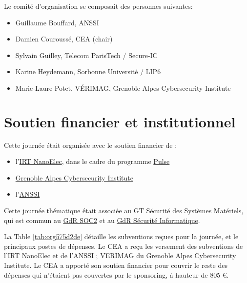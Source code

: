 \documentclass[a4paper,11pt]{article}
\begin{document}
Le comité d'organisation se composait des personnes suivantes:

\begin{itemize}
\item Guillaume Bouffard,  ANSSI
\item Damien Couroussé, CEA  (chair)
\item Sylvain Guilley, Telecom ParisTech / Secure-IC
\item Karine Heydemann, Sorbonne Université / LIP6
\item Marie-Laure Potet, VÉRIMAG,  Grenoble Alpes Cybersecurity Institute
\end{itemize}

\section{Soutien financier et institutionnel}
\label{sec:orgb8b4628}

Cette journée était organisée avec le soutien financier de :

\begin{itemize}
\item l'\href{http://www.irtnanoelec.fr}{IRT NanoElec}, dans le cadre du programme \href{http://www.irtnanoelec.fr/technologies-de-liaison}{Pulse}
\item \href{https://cybersecurity.univ-grenoble-alpes.fr}{Grenoble Alpes Cybersecurity Institute}
\item l'\href{https://www.ssi.gouv.fr}{ANSSI}
\end{itemize}

Cette journée thématique était associée au GT Sécurité des Systèmes
Matériels, qui est commun au \href{http://www.gdr-soc.cnrs.fr}{GdR SOC2} et au \href{https://gdr-securite.irisa.fr}{GdR Sécurité Informatique}.

La Table \ref{tab:org575d2de} détaille les subventions reçues pour la journée,
et le principaux postes de dépenses.
Le CEA a reçu les versement des subventions de l'IRT NanoElec et de
l'ANSSI ; VERIMAG du Grenoble Alpes Cybersecurity Institute.  Le CEA a apporté son
soutien financier pour couvrir le reste des dépenses qui n'étaient pas
couvertes par le sponsoring, à hauteur de 805 €.
\end{document}
